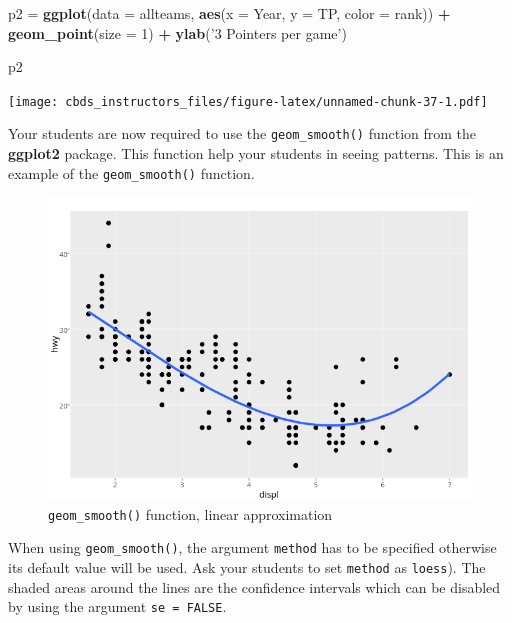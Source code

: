 \documentclass[]{book}
\newenvironment{Shaded}{\begin{snugshade}}{\end{snugshade}}
\newcommand{\DataTypeTok}[1]{\textcolor[rgb]{0.13,0.29,0.53}{#1}}
\newcommand{\DecValTok}[1]{\textcolor[rgb]{0.00,0.00,0.81}{#1}}
\newcommand{\KeywordTok}[1]{\textcolor[rgb]{0.13,0.29,0.53}{\textbf{#1}}}
\newcommand{\NormalTok}[1]{#1}
\newcommand{\OperatorTok}[1]{\textcolor[rgb]{0.81,0.36,0.00}{\textbf{#1}}}
\newcommand{\StringTok}[1]{\textcolor[rgb]{0.31,0.60,0.02}{#1}}
\begin{document}
\begin{Shaded}
\begin{Highlighting}[]
\NormalTok{p2 =}\StringTok{ }\KeywordTok{ggplot}\NormalTok{(}\DataTypeTok{data =}\NormalTok{ allteams, }\KeywordTok{aes}\NormalTok{(}\DataTypeTok{x =}\NormalTok{ Year, }\DataTypeTok{y =}\NormalTok{ TP, }\DataTypeTok{color =}\NormalTok{ rank)) }\OperatorTok{+}
\StringTok{    }\KeywordTok{geom_point}\NormalTok{(}\DataTypeTok{size =} \DecValTok{1}\NormalTok{) }\OperatorTok{+}
\StringTok{    }\KeywordTok{ylab}\NormalTok{(}\StringTok{'3 Pointers per game'}\NormalTok{)}

\NormalTok{p2}
\end{Highlighting}
\end{Shaded}

\texttt{[image: cbds\_instructors\_files/figure-latex/unnamed-chunk-37-1.pdf]}

Your students are now required to use the \texttt{geom\_smooth()} function from the \textbf{ggplot2} package. This function help your students in seeing patterns. This is an example of the \texttt{geom\_smooth()} function.

\begin{figure}
\centering
\includegraphics{./files/07_visualization_geom_smooth.png}
\caption{\texttt{geom\_smooth()} function, linear approximation}
\end{figure}

When using \texttt{geom\_smooth()}, the argument \texttt{method} has to be specified otherwise its default value will be used. Ask your students to set \texttt{method} as \texttt{\textquotesingle{}loess\textquotesingle{}}). The shaded areas around the lines are the confidence intervals which can be disabled by using the argument \texttt{se\ =\ FALSE}.
\end{document}
